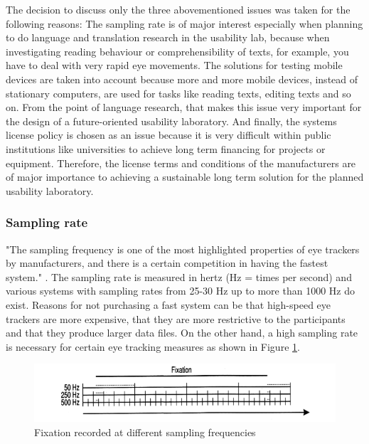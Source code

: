 \documentclass[output=paper]{langsci/langscibook}
\begin{document}
The decision to discuss only the three abovementioned issues was taken for the following reasons: The sampling rate is of major interest especially when planning to do language and translation research in the usability lab, because when investigating reading behaviour or comprehensibility of texts, for example, you have to deal with very rapid eye movements. The solutions for testing mobile devices are taken into account because more and more mobile devices, instead of stationary computers, are used for tasks like reading texts, editing texts and so on. From the point of language research, that makes this issue very important for the design of a future-oriented usability laboratory. And finally, the systems license policy is chosen as an issue because it is very difficult within public institutions like universities to achieve long term financing for projects or equipment. Therefore, the license terms and conditions of the manufacturers are of major importance to achieving a sustainable long term solution for the planned usability laboratory.


\subsubsection{Sampling rate}

"The sampling frequency is one of the most highlighted properties of eye trackers by manufacturers, and there is a certain competition in having the fastest system." \citep[p. 29]{Holmqvist2011}. The sampling rate is measured in hertz (Hz = times per second) and various systems with sampling rates from 25-30 Hz up to more than 1000 Hz do exist. Reasons for not purchasing a fast system can be that high-speed eye trackers are more expensive, that they are more restrictive to the participants and that they produce larger data files. On the other hand, a high sampling rate is necessary for certain eye tracking measures as shown in Figure \ref{roesener:fig:4}.

\begin{figure}
 \includegraphics[width=\textwidth]{figures/Roesener4.png}
 \caption{Fixation recorded at different sampling frequencies \citep[p. 31]{Holmqvist2011}}
 \label{roesener:fig:4}
\end{figure} 
\end{document}
